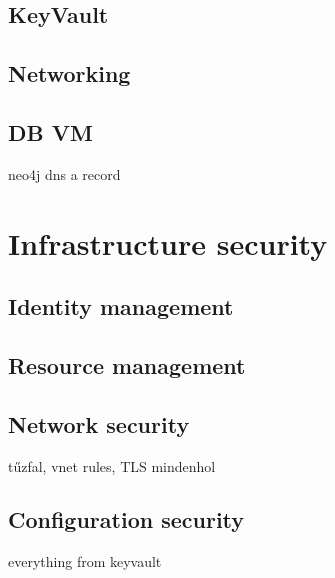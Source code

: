 \subsection{KeyVault}
\subsection{Networking}
\subsection{DB VM}

neo4j dns a record

\section{Infrastructure security}
\subsection{Identity management}
\subsection{Resource management}
\subsection{Network security}
tűzfal, vnet rules, TLS mindenhol

\subsection{Configuration security}
everything from keyvault
